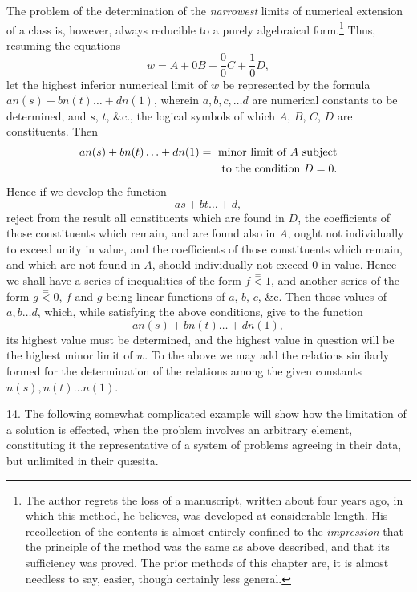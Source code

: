 \documentclass[oneside]{book}
\begin{document}
The problem of the determination of the \emph{narrowest} limits of
numerical extension of a class is, however, always reducible to a
purely algebraical form.\footnote{The author regrets the loss of a manuscript, written about four years ago,
in which this method, he believes, was developed at considerable length. His
recollection of the contents is almost entirely confined to the \emph{impression} that the
principle of the method was the same as above described, and that its sufficiency was proved.
The prior methods of this chapter are, it is almost needless
to say, easier, though certainly less general.} Thus, resuming the equations
\[
  w = A + 0B + \frac{0}{0}C + \frac{1}{0}D,
\]
let the highest inferior numerical limit of $w$ be represented by
the formula $an(s) + bn(t) \dotsc + dn(1)$, wherein $a, b, c,\dotsc d$ are
numerical constants to be determined, and $s$, $t$, \&c., the logical
symbols of which $A$, $B$, $C$, $D$ are constituents. Then
\[
\begin{split}
\hfill an(s)+ bn(t)\dotsc + dn(1)=\text{ minor limit of $A$ subject}\\
\hfill \text{ to the condition $D = 0$.}
\end{split}
\]
Hence if we develop the function
\[
  as + bt \dotsc + d,
\]
reject from the result all constituents which are found in $D$, the
coefficients of those constituents which remain, and are found
also in $A$, ought not individually to exceed unity in value, and
the coefficients of those constituents which remain, and which
are not found in $A$, should individually not exceed 0 in value.
Hence we shall have a series of inequalities of the form
$f \stackrel{=}{<} 1$,
and another series of the form $g \stackrel{=}{<} 0$, $f$ and $g$ being linear functions
of $a$, $b$, $c$, \&c. Then those values of $a, b \dotsc d$, which, while
satisfying the above conditions, give to the function
\[
  an(s) + bn(t) \dotsc + dn(1),
\]
its highest value must be determined, and the highest value in
question will be the highest minor limit of $w$. To the above we
may add the relations similarly formed for the determination of
the relations among the given constants $n(s), n(t) \dotsc n(1)$.

14. The following somewhat complicated example will show
how the limitation of a solution is effected, when the problem
involves an arbitrary element, constituting it the representative
of a system of problems agreeing in their data, but unlimited in
their qu{\ae}sita.
\end{document}
